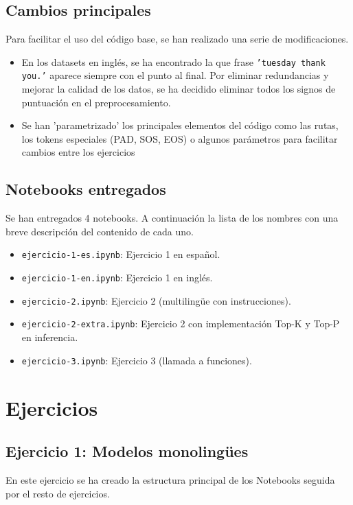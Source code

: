 \documentclass[11pt,spanish,listoffigures,listoftables]{tfgetsinf}
\begin{document}
\section{Cambios principales}
Para facilitar el uso del código base, se han realizado una serie de modificaciones.

\begin{itemize}
  \item En los datasets en inglés, se ha encontrado la que frase \texttt{'tuesday thank you.'} aparece siempre con el punto al final. Por eliminar redundancias y mejorar la calidad de los datos, se ha decidido eliminar todos los signos de puntuación en el preprocesamiento.
  \item Se han 'parametrizado' los principales elementos del código como las rutas, los tokens especiales (PAD, SOS, EOS) o algunos parámetros para facilitar cambios entre los ejercicios
\end{itemize}

\section{Notebooks entregados}
Se han entregados 4 notebooks. A continuación la lista de los nombres con una breve descripción del contenido de cada uno.
\begin{itemize}
  \item \texttt{ejercicio-1-es.ipynb}: Ejercicio 1 en español.
  \item \texttt{ejercicio-1-en.ipynb}: Ejercicio 1 en inglés.
  \item \texttt{ejercicio-2.ipynb}: Ejercicio 2 (multilingüe con instrucciones).
  \item \texttt{ejercicio-2-extra.ipynb}: Ejercicio 2 con implementación Top-K y Top-P en inferencia.
  \item \texttt{ejercicio-3.ipynb}: Ejercicio 3 (llamada a funciones).
\end{itemize}


\chapter{Ejercicios}
\section{Ejercicio 1: Modelos monolingües}
En este ejercicio se ha creado la estructura principal de los Notebooks seguida por el resto de ejercicios.
\end{document}
